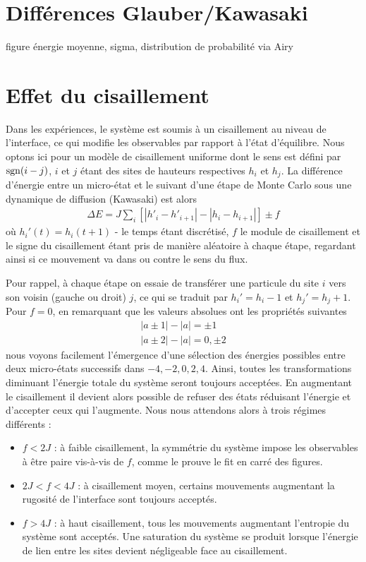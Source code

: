 	\section{Différences Glauber/Kawasaki}

figure énergie moyenne, sigma, distribution de probabilité via Airy	
	
	\section{Effet du cisaillement}

Dans les expériences, le système est soumis à un cisaillement au niveau de l'interface, ce qui modifie les observables par rapport à l'état d'équilibre. Nous optons ici pour un modèle de cisaillement uniforme dont le sens est défini par $\operatorname{sgn}(i-j)$, $i$ et $j$ étant des sites de hauteurs respectives $h_i$ et $h_j$. 
La différence d'énergie entre un micro-état et le suivant d'une étape de Monte Carlo sous une dynamique de diffusion (Kawasaki) est alors
\begin{align}
	\Delta E = J \sum_i \left[ |h'_i-h'_{i+1}|-|h_i-h_{i+1}| \right] \pm f 
\end{align}
où $h_i'(t) = h_i(t+1)$ - le temps étant discrétisé, $f$ le module de cisaillement et le signe du cisaillement étant pris de manière aléatoire à chaque étape, regardant ainsi si ce mouvement va dans ou contre le sens du flux. 

Pour rappel, à chaque étape on essaie de transférer une particule du site $i$ vers son voisin (gauche ou droit) $j$, ce qui se traduit par $h_i' = h_i-1$ et $h_j' = h_j+1$. 
Pour $f=0$, en remarquant que les valeurs absolues ont les propriétés suivantes
\begin{align}
	|a \pm 1| - |a| = \pm 1 \\
	|a \pm 2| - |a| = {0,\pm 2}
\end{align}
nous voyons facilement l'émergence d'une sélection des énergies possibles entre deux micro-états successifs dans ${-4,-2,0,2,4}$. Ainsi, toutes les transformations diminuant l'énergie totale du système seront toujours acceptées. En augmentant le cisaillement il devient alors possible de refuser des états réduisant l'énergie et d'accepter ceux qui l'augmente. 
Nous nous attendons alors à trois régimes différents :
\begin{itemize}
	\item $f  \less  2 J $ : à faible cisaillement, la symmétrie du système impose les observables à être paire vis-à-vis de $f$, comme le prouve le fit en carré des figures.
	\item $2 J \less f \less 4 J$ : à cisaillement moyen, certains mouvements augmentant la rugosité de l'interface sont toujours acceptés. 
	\item $f > 4 J$ : à haut cisaillement, tous les mouvements augmentant l'entropie du système sont acceptés. Une saturation du système se produit lorsque l'énergie de lien entre les sites devient négligeable face au cisaillement.
\end{itemize}


